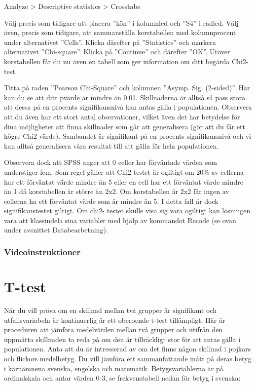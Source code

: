 \documentclass[
]{book}
\begin{document}
Analyze \textgreater{} Descriptive statistics \textgreater{} Crosstabs

Välj precis som tidigare att placera ''kön'' i kolumnled och ''S4'' i radled. Välj även, precis som tidigare,
att sammanställa korstabellen med kolumnprocent under alternativet ''Cells''. Klicka därefter på
''Statistics'' och markera alternativet ''Chi-square''. Klicka på ''Continue'' och därefter ''OK''. Utöver korstabellen får du nu även en tabell som ger
information om ditt begärda Chi2-test.

Titta på raden ''Pearson Chi-Square'' och kolumnen ''Asymp. Sig. (2-sided)''. Här kan du se att ditt pvärde
är mindre än 0.01. Skillnaderna är alltså så pass stora att dessa på en procents signifikansnivå kan
antas gälla i populationen. Observera att du även har ett stort antal observationer, vilket även det har
betydelse för dina möjligheter att finna skillnader som går att generalisera (gör att du får ett högre Chi2
värde). Sambandet är signifikant på en procents signifikansnivå och vi kan alltså generalisera våra
resultat till att gälla för hela populationen.

Observera dock att SPSS anger att 0 celler har förväntade värden som understiger fem. Som regel gäller
att Chi2-testet är ogiltigt om 20\% av cellerna har ett förväntat värde mindre än 5 eller en cell har ett
förväntat värde mindre än 1 då korstabellen är större än 2x2. Om korstabellen är 2x2 får ingen av
cellerna ha ett förväntat värde som är mindre än 5. I detta fall är dock signifikanstestet giltigt. Om chi2-
testet skulle visa sig vara ogiltigt kan lösningen vara att klassindela sina variabler med hjälp av
kommandot Recode (se ovan under avsnittet Databearbetning).

\hypertarget{videoinstruktioner-7}{%
\subsection{Videoinstruktioner}\label{videoinstruktioner-7}}

\hypertarget{t-test}{%
\chapter{T-test}\label{t-test}}

När du vill pröva om en skillnad mellan två grupper är signifikant och utfallsvariabeln är kontinuerlig är
ett oberoende t-test tillämpligt. Här är proceduren att jämföra medelvärden mellan två grupper och
utifrån den uppmätta skillnaden ta reda på om den är tillräckligt stor för att antas gälla i populationen.
Anta att du är intresserad av om det finns någon skillnad i pojkars och flickors medelbetyg. Du vill
jämföra ett sammanfattande mått på deras betyg i kärnämnena svenska, engelska och matematik.
Betygsvariablerna är på ordinalskala och antar värden 0-3, se frekvenstabell nedan för betyg i
svenska:
\end{document}
